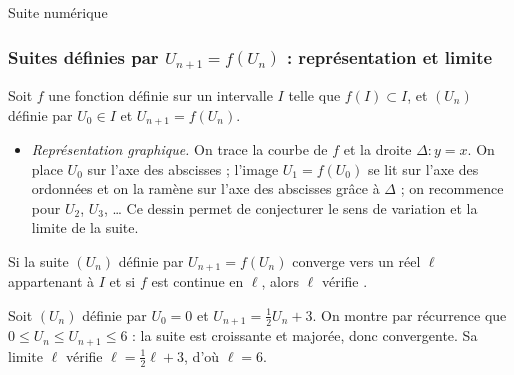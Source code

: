 \begin{chapter}{Suite num\'erique}
\subsubsection{Suites d\'efinies par $U_{n+1} = f(U_n)$ : repr\'esentation et limite}
Soit $f$ une fonction d\'efinie sur un intervalle $I$ telle que $f(I) \subset I$, et $(U_n)$ d\'efinie par $U_0 \in I$ et $U_{n+1} = f(U_n)$.
\begin{itemize}
\item \emph{Repr\'esentation graphique.} On trace la courbe de $f$ et la droite $\Delta : y = x$.
      On place $U_0$ sur l'axe des abscisses ; l'image $U_1 = f(U_0)$ se lit sur l'axe des ordonn\'ees et on la ram\`ene
      sur l'axe des abscisses gr\^ace \`a $\Delta$ ; on recommence pour $U_2$, $U_3$, \ldots{}
      Ce dessin permet de conjecturer le sens de variation et la limite de la suite.
\end{itemize}
\begin{thm}
Si la suite $(U_n)$ d\'efinie par $U_{n+1} = f(U_n)$ converge vers un r\'eel $\ell$ appartenant \`a $I$ et si $f$ est continue en $\ell$,
alors $\ell$ v\'erifie .
\end{thm}
\begin{ex}
Soit $(U_n)$ d\'efinie par $U_0 = 0$ et $U_{n+1} = \frac{1}{2} U_n + 3$.
On montre par r\'ecurrence que $0 \leq U_n \leq U_{n+1} \leq 6$ : la suite est croissante et major\'ee, donc convergente.
Sa limite $\ell$ v\'erifie $\ell = \frac{1}{2}\ell + 3$, d'o\`u $\ell = 6$.
\end{ex}
%
























\end{chapter}

